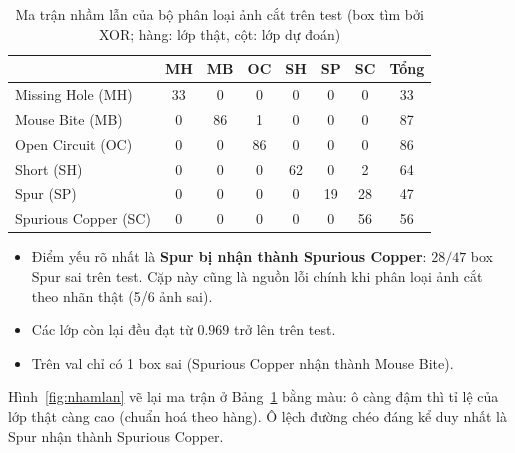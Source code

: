 \documentclass[11pt,a4paper]{article}
\newcommand{\hinhref}[1]{Hình~\ref{fig:#1}}
\newcommand{\bangref}[1]{Bảng~\ref{tab:#1}}
\begin{document}
\begin{table}[H]
\centering
\small
\caption{Ma trận nhầm lẫn của bộ phân loại ảnh cắt trên test (box tìm bởi XOR; hàng: lớp thật, cột: lớp dự đoán)}\label{tab:nhamlan}
\begin{tabular}{l|cccccc|c}
\toprule
 & MH & MB & OC & SH & SP & SC & \textbf{Tổng} \\ \midrule
Missing Hole (MH) & 33 & 0 & 0 & 0 & 0 & 0 & 33 \\
Mouse Bite (MB) & 0 & 86 & 1 & 0 & 0 & 0 & 87 \\
Open Circuit (OC) & 0 & 0 & 86 & 0 & 0 & 0 & 86 \\
Short (SH) & 0 & 0 & 0 & 62 & 0 & 2 & 64 \\
Spur (SP) & 0 & 0 & 0 & 0 & 19 & 28 & 47 \\
Spurious Copper (SC) & 0 & 0 & 0 & 0 & 0 & 56 & 56 \\ \bottomrule
\end{tabular}
\end{table}
\begin{itemize}
  \item Điểm yếu rõ nhất là \textbf{Spur bị nhận thành Spurious Copper}: $28/47$ box Spur sai trên test. Cặp này cũng là nguồn lỗi chính khi phân loại ảnh cắt theo nhãn thật (5/6 ảnh sai).
  \item Các lớp còn lại đều đạt từ $0.969$ trở lên trên test.
  \item Trên val chỉ có 1 box sai (Spurious Copper nhận thành Mouse Bite).
\end{itemize}

\hinhref{nhamlan} vẽ lại ma trận ở \bangref{nhamlan} bằng màu: ô càng đậm thì tỉ lệ của lớp thật càng cao (chuẩn hoá theo hàng). Ô lệch đường chéo đáng kể duy nhất là Spur nhận thành Spurious Copper.
\end{document}
